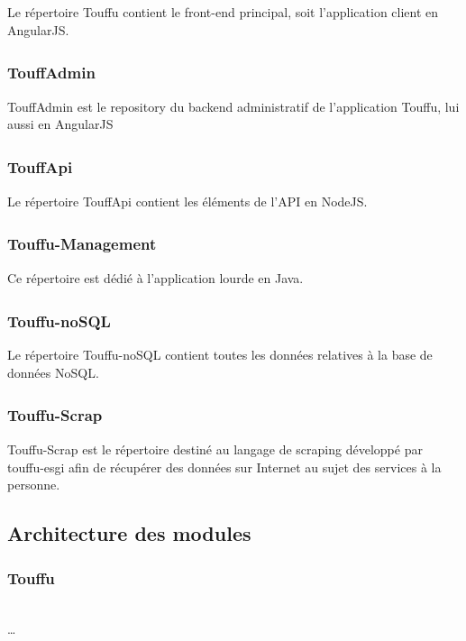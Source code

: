 \documentclass[conference]{IEEEtran}
\newcommand{\bibRef}[1]
{\textsuperscript{\cite{#1}}}
\begin{document}
Le répertoire Touffu contient le front-end principal, soit l'application client en AngularJS.\\

\subsubsection*{TouffAdmin\bibRef{TouffAdmin} }

TouffAdmin est le repository du backend administratif de l'application Touffu, lui aussi en AngularJS\\

\subsubsection*{TouffApi\bibRef{TouffApi} }

Le répertoire TouffApi contient les éléments de l'API en NodeJS.\\

\subsubsection*{Touffu-Management\bibRef{Touffu-Management} }

Ce répertoire est dédié à l'application lourde en Java.\\

\subsubsection*{Touffu-noSQL\bibRef{Touffu-noSQL} }

Le répertoire Touffu-noSQL contient toutes les données relatives à la base de données NoSQL.\\

\subsubsection*{Touffu-Scrap\bibRef{Touffu-Scrap} }

Touffu-Scrap est le répertoire destiné au langage de scraping développé par touffu-esgi afin de récupérer des données sur Internet au sujet des services à la personne.\\

\subsection{Architecture des modules}

\subsubsection*{Touffu}
\hfil\\
…\\
\end{document}
